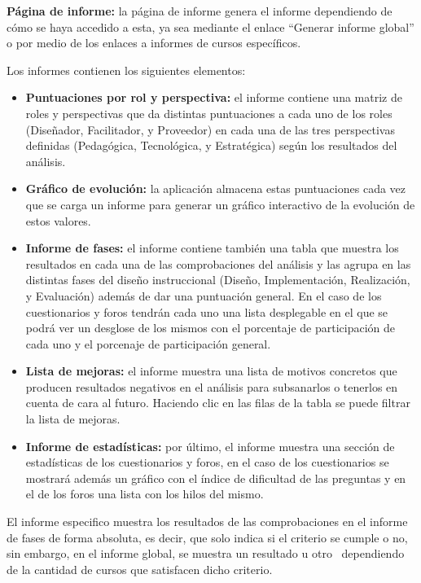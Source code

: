 \textbf{Página de informe:} la página de informe genera el informe
dependiendo de cómo se haya accedido a esta, ya sea mediante el enlace
``Generar informe global'' o por medio de los enlaces a informes de cursos
específicos.~

Los informes contienen los siguientes elementos:

\begin{itemize}
	\item
	\textbf{Puntuaciones por rol y perspectiva:} el informe contiene una
	matriz de roles y perspectivas que da distintas puntuaciones a cada
	uno de los roles (Diseñador, Facilitador, y Proveedor) en cada una de
	las tres perspectivas definidas (Pedagógica, Tecnológica, y
	Estratégica) según los resultados del análisis.
	\item
	\textbf{Gráfico de evolución:} la aplicación almacena estas puntuaciones cada vez que se carga un informe para generar un gráfico interactivo de la evolución de estos valores.
	\item
	\textbf{Informe de fases:} el informe contiene también una tabla que
	muestra los resultados en cada una de las comprobaciones del análisis y
	las agrupa en las distintas fases del diseño instruccional (Diseño,
	Implementación, Realización, y Evaluación) además de dar una
	puntuación general. En el caso de los cuestionarios y foros tendrán cada uno una lista desplegable en el que se podrá ver un desglose de los mismos con el porcentaje de participación de cada uno y el porcenaje de participación general.
	\item
	\textbf{Lista de mejoras:} el informe muestra una lista de
	motivos concretos que producen resultados negativos en el análisis
	para subsanarlos o tenerlos en cuenta de cara al futuro. Haciendo clic en las filas de la tabla se puede filtrar la lista de mejoras.
	\item
	\textbf{Informe de estadísticas:} por último, el informe muestra una sección de estadísticas de los cuestionarios y foros, en el caso de los cuestionarios se mostrará además un gráfico con el índice de dificultad de las preguntas y en el de los foros una lista con los hilos del mismo.
\end{itemize}

El informe especifico muestra los resultados de las comprobaciones en el informe de fases de forma absoluta, es decir, que solo indica si el criterio se cumple o no, sin embargo, en el informe global, se muestra un resultado u otro ~dependiendo de la cantidad de cursos que satisfacen dicho criterio.


